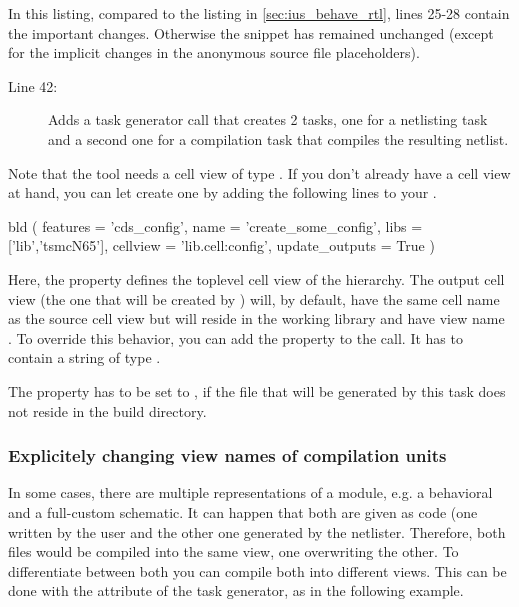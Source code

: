 In this listing, compared to the listing in \cref{sec:ius_behave_rtl}, lines
25-28 contain the important changes. Otherwise the snippet has remained
unchanged (except for the implicit changes in the anonymous source file
placeholders).
\begin{description}
    \item[Line 42:] Adds a task generator call that creates 2 tasks, one for
        a netlisting task and a second one for a compilation task that compiles
        the resulting netlist.
\end{description}

\warningsign Note that the  tool needs a cell view
of type . If you don't already have a  cell view at hand,
you can let  create one by adding the following lines to your
.
\begin{lstwscript}
bld (                                                                          
    features = 'cds_config',
    name = 'create_some_config',
    libs = ['lib','tsmcN65'],
    cellview = 'lib.cell:config',
    update_outputs = True
)
\end{lstwscript}

Here, the  property defines the toplevel cell view of the
hierarchy. The output cell view (the one that will be created by )
will, by default, have the same cell name as the source cell view but will
reside in the working library and have view name . To
override this behavior, you can add the property  to the
call. It has to contain a string of type .

The  property has to be set to , if the file
that will be generated by this task does not reside in the build directory.

\subsubsection{Explicitely changing view names of compilation units}
In some cases, there are multiple representations of a module, e.g. a
behavioral and a full-custom schematic. It can happen that both are given as
 code (one written by the user and the other one generated by
the netlister. Therefore, both files would be compiled into the same view, one
overwriting the other. To differentiate between both you can compile both into
different views. This can be done with the  attribute of the task
generator, as in the following example.

